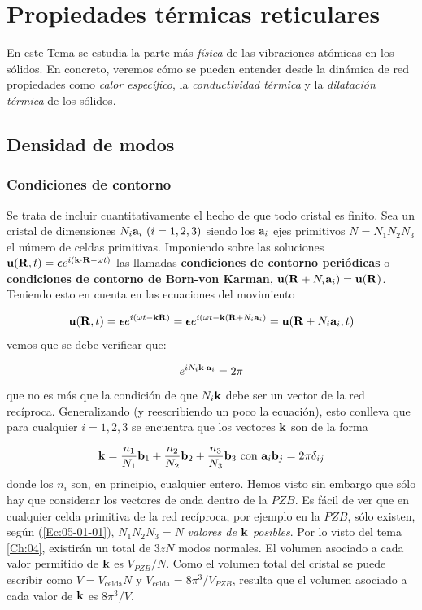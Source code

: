 \chapter{Propiedades térmicas reticulares} \label{Ch:05}

En este Tema se estudia la parte más \textit{física} de las vibraciones atómicas en los sólidos. En concreto, veremos cómo se pueden entender desde la dinámica de red propiedades como \textit{calor específico}, la \textit{conductividad térmica} y la \textit{dilatación térmica} de los sólidos.

\section{Densidad de modos}

\subsection{Condiciones de contorno}

Se trata de incluir cuantitativamente el hecho de que todo cristal es finito. Sea un cristal de dimensiones $N_i \mathbf{a}_i  \ (i=1,2,3)$ siendo los $\mathbf{a}_i$ ejes primitivos $N=N_1N_2N_3$ el número de celdas primitivas. Imponiendo sobre las soluciones $\mathbf{u}(\mathbf{R},t)= \boldsymbol{\epsilon} e^{i(\mathbf{k} \cdot \mathbf{R} - \omega t)}$ las llamadas \textbf{condiciones de contorno periódicas} o \textbf{condiciones de contorno de Born-von Karman}, $\mathbf{u}(\mathbf{R} + N_i \mathbf{a}_i) = \mathbf{u} (\mathbf{R})$. Teniendo esto en cuenta en las ecuaciones del movimiento

\begin{equation*}
	\mathbf{u}(\mathbf{R},t) =\boldsymbol{\epsilon} e^{i(\omega t - \mathbf{k} \mathbf{R})} = \boldsymbol{\epsilon} e^{i(\omega t - \mathbf{k} (\mathbf{R}+N_i\mathbf{a}_i)} = \mathbf{u}(\mathbf{R}+N_i\mathbf{a}_i,t)
\end{equation*}
vemos que se debe verificar que:

\begin{equation*}
	e^{i N_i \mathbf{k} \cdot \mathbf{a}_i} = 2 \pi
\end{equation*}
que no es más que la condición de que $N_i \mathbf{k}$ debe ser un vector de la red recíproca. Generalizando (y reescribiendo un poco la ecuación), esto conlleva que para cualquier $i=1,2,3$ se encuentra que los vectores $\mathbf{k}$ son de la forma

\begin{equation}
	\mathbf{k} = \frac{n_1}{N_1} \mathbf{b}_1 + \frac{n_2}{N_2} \mathbf{b}_2 + \frac{n_3}{N_3} \mathbf{b}_3 \ \text{con} \ \mathbf{a}_i \mathbf{b}_j = 2 \pi \delta_{ij} \label{Ec:05-01-01}
\end{equation}
donde los $n_i$ son, en principio, cualquier entero. Hemos visto sin embargo que sólo hay que considerar los vectores de onda dentro de la $PZB$. Es fácil de ver que en cualquier celda primitiva de la red recíproca, por ejemplo en la $PZB$, sólo existen, según (\ref{Ec:05-01-01}), $N_1N_2N_3=N$ \textit{valores de $\mathbf{k}$ posibles}. Por lo visto del tema \ref{Ch:04}, existirán un total de $3zN$ modos normales. El volumen asociado a cada valor permitido de $\mathbf{k}$ es $V_{PZB}/N$. Como el volumen total del cristal se puede escribir como $V=V_{\text{celda}} N$ y $V_{\text{celda}} = 8 \pi^3 /V_{PZB}$, resulta que el volumen asociado a cada valor de $\mathbf{k}$ es $8 \pi^3/ V$.

